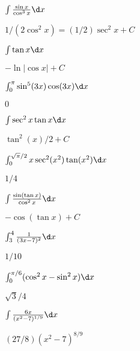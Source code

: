 \begin{exercises}
\begin{exercise} $\int {\sin x\over\cos^3 x}\d x$
\begin{answer} $1/(2\cos^2 x)=(1/2)\sec^2x+C$
\end{answer}\end{exercise}

\begin{exercise} $\int\tan x\d x$
\begin{answer} $-\ln|\cos x|+C$
\end{answer}\end{exercise}

\begin{exercise}  $\int_0^\pi\sin^5(3x)\cos(3x)\d x$
\begin{answer} $0$
\end{answer}\end{exercise}

\begin{exercise} $\int\sec^2x\tan x\d x$
\begin{answer} $\tan^2(x)/2+C$
\end{answer}\end{exercise}

\begin{exercise} $\int_0^{\sqrt{\pi}/2} x\sec^2(x^2)\tan(x^2)\d x$
\begin{answer} $1/4$
\end{answer}\end{exercise}

\begin{exercise} $\int {\sin(\tan x)\over\cos^2x}\d x$
\begin{answer} $-\cos(\tan x)+C$
\end{answer}\end{exercise}

\begin{exercise} $\int_3^4 {1\over(3x-7)^2}\d x$
\begin{answer} $1/10$
\end{answer}\end{exercise}

\begin{exercise} $\int_0^{\pi/6}(\cos^2x - \sin^2x)\d x$
\begin{answer} $\sqrt3/4$
\end{answer}\end{exercise}

\begin{exercise} $\int {6x\over(x^2 - 7)^{1/9}}\d x$
\begin{answer} $(27/8)(x^2-7)^{8/9}$
\end{answer}\end{exercise}


\end{exercises}
